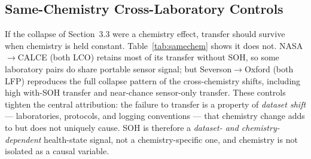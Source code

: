 \documentclass[preprint,12pt]{elsarticle}
\begin{document}
\begin{table}[!t]
\caption{Failure-Definition Ablation at H=20 (XGBoost, ALL-LCO Source, Pooled AUC [CI]): Transfer With and Without SOH as a Feature, for Three Label Endpoints.}
\label{tab:faildef}
\centering
{}
\end{table}

\subsection{Same-Chemistry Cross-Laboratory Controls}
If the collapse of Section~3.3 were a chemistry effect, transfer should survive when chemistry is held constant. Table~\ref{tab:samechem} shows it does not. NASA$\to$CALCE (both LCO) retains most of its transfer without SOH, so some laboratory pairs do share portable sensor signal; but Severson$\to$Oxford (both LFP) reproduces the full collapse pattern of the cross-chemistry shifts, including high with-SOH transfer and near-chance sensor-only transfer. These controls tighten the central attribution: the failure to transfer is a property of \emph{dataset shift} --- laboratories, protocols, and logging conventions --- that chemistry change adds to but does not uniquely cause. SOH is therefore a \emph{dataset- and chemistry-dependent} health-state signal, not a chemistry-specific one, and chemistry is not isolated as a causal variable.
\end{document}
